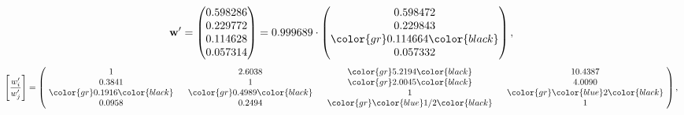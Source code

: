 \begin{example}
\begin{equation*}
\mathbf{w}^{\prime} =
\begin{pmatrix}
0.598286\\
0.229772\\
0.114628\\
0.057314
\end{pmatrix} =
0.999689\cdot
\begin{pmatrix}
0.598472\\
0.229843\\
\color{gr} 0.114664\color{black} \\
0.057332
\end{pmatrix},
\end{equation*}
\begin{equation*}
\left[ \frac{{w}^{\prime}_i}{{w}^{\prime}_j} \right] =
\begin{pmatrix}
$\,\,$ 1 $\,\,$ & $\,\,$2.6038$\,\,$ & $\,\,$\color{gr} 5.2194\color{black} $\,\,$ & $\,\,$10.4387$\,\,$ \\
$\,\,$0.3841$\,\,$ & $\,\,$ 1 $\,\,$ & $\,\,$\color{gr} 2.0045\color{black} $\,\,$ & $\,\,$4.0090  $\,\,$ \\
$\,\,$\color{gr} 0.1916\color{black} $\,\,$ & $\,\,$\color{gr} 0.4989\color{black} $\,\,$ & $\,\,$ 1 $\,\,$ & $\,\,$\color{gr} \color{blue} 2\color{black}  $\,\,$ \\
$\,\,$0.0958$\,\,$ & $\,\,$0.2494$\,\,$ & $\,\,$\color{gr} \color{blue}  1/2\color{black} $\,\,$ & $\,\,$ 1  $\,\,$ \\
\end{pmatrix},
\end{equation*}
\end{example}
\newpage
